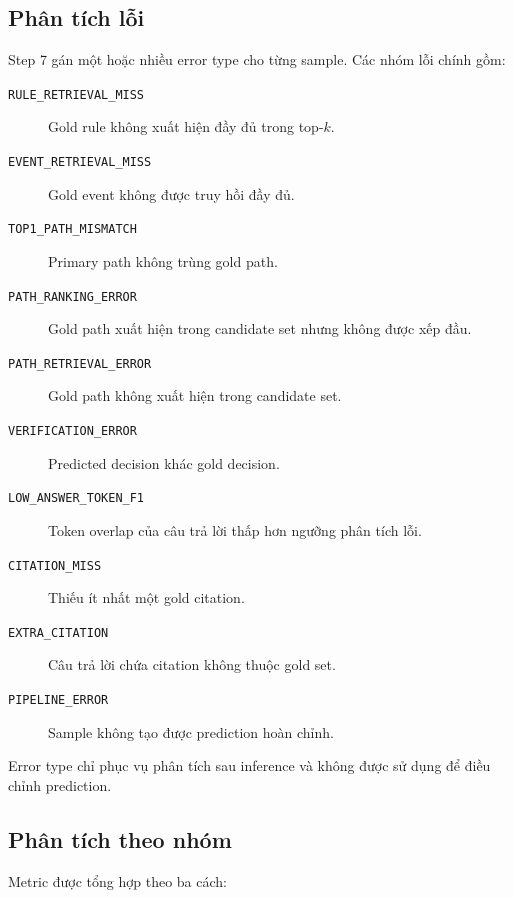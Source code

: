 \subsection{Phân tích lỗi}

Step 7 gán một hoặc nhiều error type cho từng sample. Các nhóm lỗi chính
gồm:

\begin{description}
    \item[\texttt{RULE\_RETRIEVAL\_MISS}]
    Gold rule không xuất hiện đầy đủ trong top-\(k\).

    \item[\texttt{EVENT\_RETRIEVAL\_MISS}]
    Gold event không được truy hồi đầy đủ.

    \item[\texttt{TOP1\_PATH\_MISMATCH}]
    Primary path không trùng gold path.

    \item[\texttt{PATH\_RANKING\_ERROR}]
    Gold path xuất hiện trong candidate set nhưng không được xếp đầu.

    \item[\texttt{PATH\_RETRIEVAL\_ERROR}]
    Gold path không xuất hiện trong candidate set.

    \item[\texttt{VERIFICATION\_ERROR}]
    Predicted decision khác gold decision.

    \item[\texttt{LOW\_ANSWER\_TOKEN\_F1}]
    Token overlap của câu trả lời thấp hơn ngưỡng phân tích lỗi.

    \item[\texttt{CITATION\_MISS}]
    Thiếu ít nhất một gold citation.

    \item[\texttt{EXTRA\_CITATION}]
    Câu trả lời chứa citation không thuộc gold set.

    \item[\texttt{PIPELINE\_ERROR}]
    Sample không tạo được prediction hoàn chỉnh.
\end{description}

Error type chỉ phục vụ phân tích sau inference và không được sử dụng để điều
chỉnh prediction.

\subsection{Phân tích theo nhóm}

Metric được tổng hợp theo ba cách:

